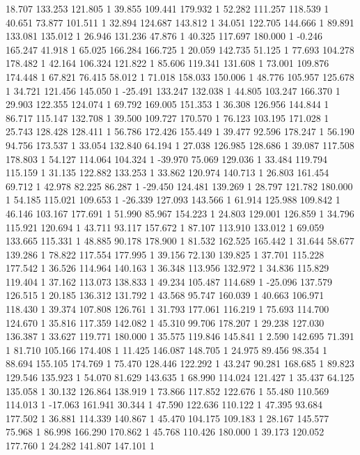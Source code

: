 	18.707 133.253 121.805 1
	39.855 109.441 179.932 1
	52.282 111.257 118.539 1
	40.651 73.877 101.511 1
	32.894 124.687 143.812 1
	34.051 122.705 144.666 1
	89.891 133.081 135.012 1
	26.946 131.236 47.876 1
	40.325 117.697 180.000 1
	-0.246 165.247 41.918 1
	65.025 166.284 166.725 1
	20.059 142.735 51.125 1
	77.693 104.278 178.482 1
	42.164 106.324 121.822 1
	85.606 119.341 131.608 1
	73.001 109.876 174.448 1
	67.821 76.415 58.012 1
	71.018 158.033 150.006 1
	48.776 105.957 125.678 1
	34.721 121.456 145.050 1
	-25.491 133.247 132.038 1
	44.805 103.247 166.370 1
	29.903 122.355 124.074 1
	69.792 169.005 151.353 1
	36.308 126.956 144.844 1
	86.717 115.147 132.708 1
	39.500 109.727 170.570 1
	76.123 103.195 171.028 1
	25.743 128.428 128.411 1
	56.786 172.426 155.449 1
	39.477 92.596 178.247 1
	56.190 94.756 173.537 1
	33.054 132.840 64.194 1
	27.038 126.985 128.686 1
	39.087 117.508 178.803 1
	54.127 114.064 104.324 1
	-39.970 75.069 129.036 1
	33.484 119.794 115.159 1
	31.135 122.882 133.253 1
	33.862 120.974 140.713 1
	26.803 161.454 69.712 1
	42.978 82.225 86.287 1
	-29.450 124.481 139.269 1
	28.797 121.782 180.000 1
	54.185 115.021 109.653 1
	-26.339 127.093 143.566 1
	61.914 125.988 109.842 1
	46.146 103.167 177.691 1
	51.990 85.967 154.223 1
	24.803 129.001 126.859 1
	34.796 115.921 120.694 1
	43.711 93.117 157.672 1
	87.107 113.910 133.012 1
	69.059 133.665 115.331 1
	48.885 90.178 178.900 1
	81.532 162.525 165.442 1
	31.644 58.677 139.286 1
	78.822 117.554 177.995 1
	39.156 72.130 139.825 1
	37.701 115.228 177.542 1
	36.526 114.964 140.163 1
	36.348 113.956 132.972 1
	34.836 115.829 119.404 1
	37.162 113.073 138.833 1
	49.234 105.487 114.689 1
	-25.096 137.579 126.515 1
	20.185 136.312 131.792 1
	43.568 95.747 160.039 1
	40.663 106.971 118.430 1
	39.374 107.808 126.761 1
	31.793 177.061 116.219 1
	75.693 114.700 124.670 1
	35.816 117.359 142.082 1
	45.310 99.706 178.207 1
	29.238 127.030 136.387 1
	33.627 119.771 180.000 1
	35.575 119.846 145.841 1
	2.590 142.695 71.391 1
	81.710 105.166 174.408 1
	11.425 146.087 148.705 1
	24.975 89.456 98.354 1
	88.694 155.105 174.769 1
	75.470 128.446 122.292 1
	43.247 90.281 168.685 1
	89.823 129.546 135.923 1
	54.070 81.629 143.635 1
	68.990 114.024 121.427 1
	35.437 64.125 135.058 1
	30.132 126.864 138.919 1
	73.866 117.852 122.676 1
	55.480 110.569 114.013 1
	-17.063 161.941 30.344 1
	47.590 122.636 110.122 1
	47.395 93.684 177.502 1
	36.881 114.339 140.867 1
	45.470 104.175 109.183 1
	28.167 145.577 75.968 1
	86.998 166.290 170.862 1
	45.768 110.426 180.000 1
	39.173 120.052 177.760 1
	24.282 141.807 147.101 1
